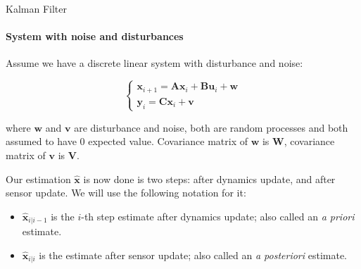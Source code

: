 \documentclass{beamer}
\begin{document}
\begin{frame}{Kalman Filter}
\framesubtitle{System with noise and disturbances}
\begin{flushleft}

Assume we have a discrete linear system with disturbance and noise:

\[
\begin{cases}
\mathbf x_{i+1} = \mathbf A \mathbf x_i + 
\mathbf B \mathbf u_i + \mathbf w\\
\mathbf y_i = \mathbf C \mathbf x_i  + \mathbf v
\end{cases}
\]

where $\mathbf w$ and $\mathbf v$ are disturbance and noise, both are random processes and both assumed to have 0 expected value. Covariance matrix of $\mathbf w$ is $\mathbf W$, covariance matrix of $\mathbf v$ is $\mathbf V$.

\bigskip

Our estimation $\hat{\mathbf x}$ is now done is two steps: after dynamics update, and after sensor update. We will use the following notation for it:

\begin{itemize}
    \item $\hat{\mathbf x}_{i|i-1}$ is the $i$-th step estimate after dynamics update; also called an \emph{a priori} estimate.
    \item $\hat{\mathbf x}_{i|i}$ is the estimate after sensor update; also called an \emph{a posteriori} estimate.
\end{itemize}

\end{flushleft}
\end{frame}
\end{document}
